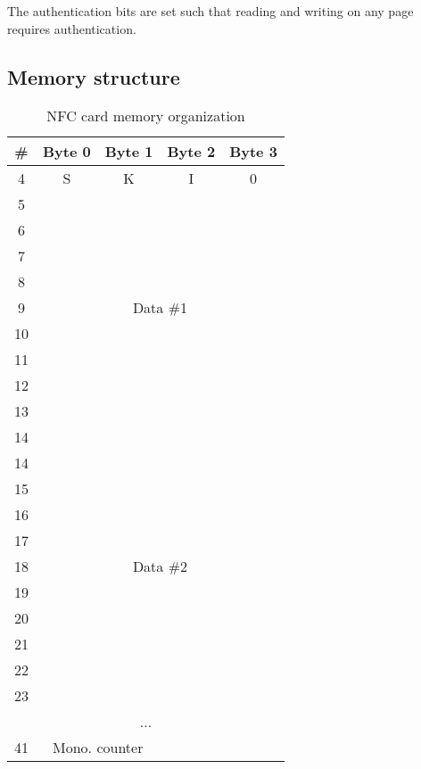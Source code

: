 \documentclass[paper=a4, fontsize=11pt]{scrartcl}
\begin{document}
The authentication bits are set such that reading and writing on any page
requires authentication.

\subsection{Memory structure}

\begin{table}[H]
    \centering
    \begin{tabular}{|c|c|c|c|c|}
        \hline
        \# & Byte 0 & Byte 1 & Byte 2 & Byte 3 \\
        \hline
        4 & S & K & I & 0 \\
        \hline
        5 & \multicolumn{4}{|c|}{\multirow{9}{*}{Data \#1}} \\
        6 & \multicolumn{4}{|c|}{} \\
        7 & \multicolumn{4}{|c|}{} \\
        8 & \multicolumn{4}{|c|}{} \\
        9 & \multicolumn{4}{|c|}{} \\
        10 & \multicolumn{4}{|c|}{} \\
        11 & \multicolumn{4}{|c|}{} \\
        12 & \multicolumn{4}{|c|}{} \\
        13 & \multicolumn{4}{|c|}{} \\
        14 & \multicolumn{4}{|c|}{} \\
        \hline
        14 & \multicolumn{4}{|c|}{\multirow{9}{*}{Data \#2}} \\
        15 & \multicolumn{4}{|c|}{} \\
        16 & \multicolumn{4}{|c|}{} \\
        17 & \multicolumn{4}{|c|}{} \\
        18 & \multicolumn{4}{|c|}{} \\
        19 & \multicolumn{4}{|c|}{} \\
        20 & \multicolumn{4}{|c|}{} \\
        21 & \multicolumn{4}{|c|}{} \\
        22 & \multicolumn{4}{|c|}{} \\
        23 & \multicolumn{4}{|c|}{} \\
        \hline
        \multicolumn{5}{|c|}{...} \\
        \hline
        41 & \multicolumn{2}{|c|}{Mono. counter} & & \\
        \hline
    \end{tabular}
    \caption{NFC card memory organization}
    \label{t1}
\end{table}
\end{document}
